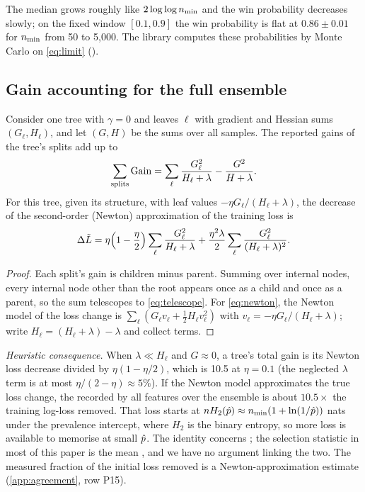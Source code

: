 The median grows roughly like $2\log\log n_{\min}$ and the win probability decreases slowly; on the fixed window $[0.1, 0.9]$ the win probability is flat at $0.86\pm0.01$ for $n_{\min}$ from 50 to 5{,}000. The library computes these probabilities by Monte Carlo on \eqref{eq:limit} ().

\subsection{Gain accounting for the full ensemble}\label{app:accounting}

\begin{proposition}\label{prop:accounting}
Consider one tree with $\gamma = 0$ and leaves $\ell$ with gradient and Hessian sums $(G_\ell, H_\ell)$, and let $(G,H)$ be the sums over all samples. The reported gains of the tree's splits add up to
\begin{equation}\label{eq:telescope}
  \sum_{\text{splits}}\operatorname{Gain} = \sum_\ell\frac{G_\ell^2}{H_\ell+\lambda} - \frac{G^2}{H+\lambda}.
\end{equation}
For this tree, given its structure, with leaf values $-\eta G_\ell/(H_\ell+\lambda)$, the decrease of the second-order (Newton) approximation of the training loss is
\begin{equation}\label{eq:newton}
  \Delta\tilde L = \eta\Bigl(1-\frac\eta2\Bigr)\sum_\ell\frac{G_\ell^2}{H_\ell+\lambda} + \frac{\eta^2\lambda}{2}\sum_\ell\frac{G_\ell^2}{(H_\ell+\lambda)^2}.
\end{equation}
\end{proposition}

\begin{proof}
Each split's gain is children minus parent. Summing over internal nodes, every internal node other than the root appears once as a child and once as a parent, so the sum telescopes to \eqref{eq:telescope}. For \eqref{eq:newton}, the Newton model of the loss change is $\sum_\ell(G_\ell v_\ell + \tfrac12H_\ell v_\ell^2)$ with $v_\ell = -\eta G_\ell/(H_\ell+\lambda)$; write $H_\ell = (H_\ell+\lambda)-\lambda$ and collect terms.
\end{proof}

\emph{Heuristic consequence.} When $\lambda\ll H_\ell$ and $G\approx 0$, a tree's total gain is its Newton loss decrease divided by $\eta(1-\eta/2)$, which is 10.5 at $\eta = 0.1$ (the neglected $\lambda$ term is at most $\eta/(2-\eta)\approx 5\%$). If the Newton model approximates the true loss change, the  recorded by all features over the ensemble is about $10.5\times$ the training log-loss removed. That loss starts at $nH_2(\hat p)\approx n_{\min}(1+\ln(1/\hat p))$ nats under the prevalence intercept, where $H_2$ is the binary entropy, so more loss is available to memorise at small $\hat p$. The identity concerns ; the selection statistic in most of this paper is the mean , and we have no argument linking the two. The measured fraction of the initial loss removed is a Newton-approximation estimate (\cref{app:agreement}, row P15).

